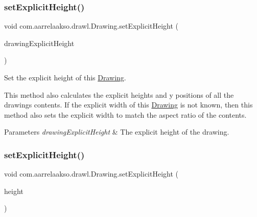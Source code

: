 \subsubsection{\texorpdfstring{set\+Explicit\+Height()}{setExplicitHeight()}\hspace{0.1cm}{\footnotesize\ttfamily [1/3]}}
{\footnotesize\ttfamily void com.\+aarrelaakso.\+drawl.\+Drawing.\+set\+Explicit\+Height (\begin{DoxyParamCaption}\item[{@Not\+Null \hyperlink{classcom_1_1aarrelaakso_1_1drawl_1_1_drawl_number}{Drawl\+Number}}]{drawing\+Explicit\+Height }\end{DoxyParamCaption})\hspace{0.3cm}{\ttfamily [private]}}



Set the explicit height of this \hyperlink{classcom_1_1aarrelaakso_1_1drawl_1_1_drawing}{Drawing}. 

This method also calculates the explicit heights and y positions of all the drawing\textquotesingle{}s contents. If the explicit width of this \hyperlink{classcom_1_1aarrelaakso_1_1drawl_1_1_drawing}{Drawing} is not known, then this method also sets the explicit width to match the aspect ratio of the contents.


\begin{DoxyParams}{Parameters}
{\em drawing\+Explicit\+Height} & The explicit height of the drawing. \\
\hline
\end{DoxyParams}
\mbox{\label{classcom_1_1aarrelaakso_1_1drawl_1_1_drawing_a48a4a44d49cf54821b6cb50adad143c3}} 
\subsubsection{\texorpdfstring{set\+Explicit\+Height()}{setExplicitHeight()}\hspace{0.1cm}{\footnotesize\ttfamily [2/3]}}
{\footnotesize\ttfamily void com.\+aarrelaakso.\+drawl.\+Drawing.\+set\+Explicit\+Height (\begin{DoxyParamCaption}\item[{Float}]{height }\end{DoxyParamCaption})}



